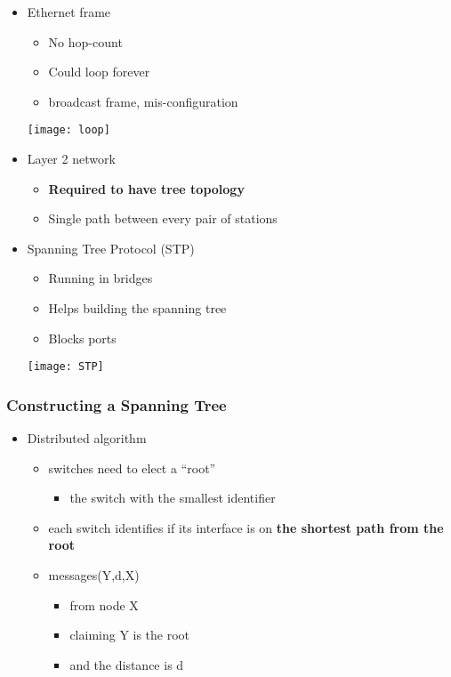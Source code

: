 \documentclass[../resumosRCOM.tex]{subfiles}
\begin{document}
\begin{itemize}
    \item Ethernet frame
    \begin{itemize}
        \item No hop-count
        \item Could loop forever
        \item broadcast frame, mis-configuration
    \end{itemize}
    \begin{center}
        \texttt{[image: loop]}
    \end{center}
    \item Layer 2 network
    \begin{itemize}
        \item \textbf{Required to have tree topology}
        \item Single path between every pair of stations
    \end{itemize}
    \item Spanning Tree Protocol (STP)
    \begin{itemize}
        \item Running in bridges
        \item Helps building the spanning tree
        \item Blocks ports
    \end{itemize}
    \begin{center}
        \texttt{[image: STP]}
    \end{center}
\end{itemize}

\subsubsection{Constructing a Spanning Tree}

\begin{itemize}
    \item Distributed algorithm
    \begin{itemize}
        \item switches need to elect a “root”
        \begin{itemize}
            \item the switch with the smallest identifier
        \end{itemize}
        \item each switch identifies if its interface is on \textbf{the shortest path from the root}
        \item messages(Y,d,X)
        \begin{itemize}
            \item from node X
            \item claiming Y is the root
            \item and the distance is d
        \end{itemize}
    \end{itemize}
\end{itemize}
\end{document}
